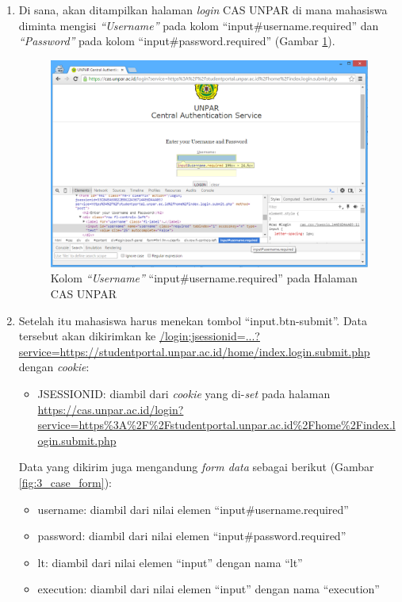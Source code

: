 \begin{enumerate}
	\item Di sana, akan ditampilkan halaman \textit{login} CAS UNPAR di mana mahasiswa diminta mengisi \textit{``Username''} pada kolom ``input\#username.required'' dan \textit{``Password''} pada kolom ``input\#password.required'' (Gambar \ref{fig:3_case_login_cas}).
	\begin{figure}[H]
			\centering
			\includegraphics[scale=0.5]{Gambar/case-login-cas}
			\caption{Kolom \textit{``Username''} ``input\#username.required'' pada Halaman CAS UNPAR} 
			\label{fig:3_case_login_cas}
		\end{figure}
	\item Setelah itu mahasiswa harus menekan tombol ``input.btn-submit''. Data tersebut akan dikirimkan ke \url{/login;jsessionid=...?service=https://studentportal.unpar.ac.id/home/index.login.submit.php} dengan \textit{cookie}:
	\begin{itemize}
		\item JSESSIONID: diambil dari \textit{cookie} yang di-\textit{set} pada halaman \url{https://cas.unpar.ac.id/login? service=https\%3A\%2F\%2Fstudentportal.unpar.ac.id\%2Fhome\%2Findex.login.submit.php}
	\end{itemize}
	 Data yang dikirim juga mengandung \textit{form data} sebagai berikut (Gambar \ref{fig:3_case_form}):
	\begin{itemize}
		\item username: diambil dari nilai elemen ``input\#username.required''
		\item password: diambil dari nilai elemen ``input\#password.required''
		\item lt: diambil dari nilai elemen ``input'' dengan nama ``lt''
		\item execution: diambil dari nilai elemen ``input'' dengan nama ``execution''

\end{itemize}
\end{enumerate}

